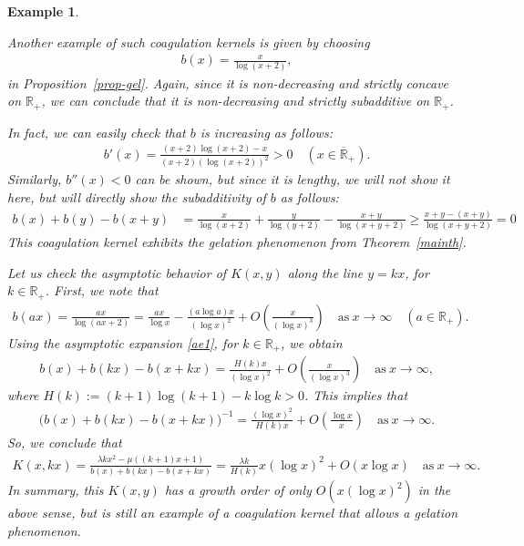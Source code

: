 \documentclass[a4paper,11pt]{article}
\newtheorem{ex}[thm]{Example}
\def\Rp{{\mathbb R}_+}
\def\Rb{\overline{{\mathbb R}}_+}
\begin{document}
\begin{ex}\label{ex2}
{\rm Another example of such coagulation kernels is
given by choosing 
\begin{align*}
b(x)=\frac{x}{\log(x+2)},
\end{align*}
in Proposition~\ref{prop-gel}.
Again, since it is non-decreasing and strictly concave on $\Rp$, we can conclude that
it is non-decreasing
and strictly subadditive on $\Rp$.

In fact, we can easily check that $b$ is increasing as follows:
\begin{align*}
b'(x)=\frac{(x+2)\log(x+2)-x}{(x+2)(\log(x+2))^2}>0 \quad (x\in\Rb).
\end{align*}
Similarly, $b''(x)<0$ can be shown, but since it is lengthy, we will not show it here, but will directly show the subadditivity of $b$ as follows:
\begin{align*}
b(x)+b(y)-b(x+y)
&=
\frac{x}{\log(x+2)}+\frac{y}{\log(y+2)}
-\frac{x+y}{\log(x+y+2)}
\ge  \frac{x+y-(x+y)}{\log(x+y+2)}= 0
\end{align*}
This coagulation kernel exhibits the gelation phenomenon from Theorem~\ref{mainth}. 

Let us check the asymptotic behavior of
$K(x,y)$ 
along the line $y=kx$, for $k\in\Rp$.
First, we note that
\begin{align}\label{ae1}
b(ax)=\frac{ax}{\log (ax+2)}
=
\frac{ax}{\log x}
-\frac{(a\log a)x}{(\log x)^2}
+O\left( \frac{x}{(\log x)^3}\right)
\quad \text{as}~x\to \infty\quad (a\in \Rp).
\end{align}
Using the asymptotic expansion \eqref{ae1}, for $k\in\Rp$, we obtain
\begin{align*}
b(x)+b(kx)-b(x+kx)
=\frac{H(k)x}{(\log x)^2}+
O\left( \frac{x}{(\log x)^3}\right)
\quad \text{as}~x\to \infty,
\end{align*}
where $H(k):=(k+1)\log(k+1)-k\log k >0$.
This implies that
\begin{align*}
\big(b(x)+b(kx)-b(x+kx)\big)^{-1}
=\frac{(\log x)^2}{H(k)x}+
O\left( \frac{\log x}{x}\right)
\quad \text{as}~x\to \infty.
\end{align*}
So, we conclude that
\begin{align*}
K(x,kx)=\frac{\lambda kx^2-\mu ((k+1)x+1)}
{b(x)+b(kx)-b(x+kx)}=
\frac{\lambda k}{H(k)}x(\log x)^2
+O(x\log x)\quad\text{as}~x\to\infty.
\end{align*}
In summary, this $K(x,y)$ has a growth order of only $O(x (\log x)^2)$ in the above sense, but is still an example of a coagulation kernel that allows a gelation phenomenon.

}
\end{ex}
\end{document}
